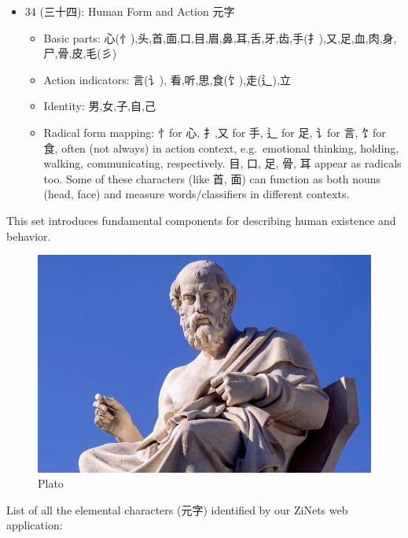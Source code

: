 \documentclass[
  11pt,
  letterpaper,
]{article}
\providecommand{\tightlist}{%
  \setlength{\itemsep}{0pt}\setlength{\parskip}{0pt}}
\begin{document}
\begin{itemize}
\tightlist
\item
  34 (三十四): Human Form and Action 元字

  \begin{itemize}
  \tightlist
  \item
    Basic parts:
    心(忄),头,首,面,口,目,眉,鼻,耳,舌,牙,齿,手(扌),又,足,血,肉,身,尸,骨,皮,毛(彡)
  \item
    Action indicators: 言(讠), 看,听,思,食(饣),走(辶),立
  \item
    Identity: 男,女,子,自,己
  \item
    Radical form mapping: 忄for 心, 扌,又 for 手, 辶 for 足, 讠for 言,
    饣for 食, often (not always) in action context, e.g.~emotional
    thinking, holding, walking, communicating, respectively. 目, 口, 足,
    骨, 耳 appear as radicals too. Some of these characters (like 首,
    面) can function as both nouns (head, face) and measure
    words/classifiers in different contexts.
  \end{itemize}
\end{itemize}

This set introduces fundamental components for describing human
existence and behavior.

\begin{figure}
\centering
\includegraphics{./images/plato.png}
\caption{Plato}
\end{figure}

List of all the elemental characters (元字) identified by our ZiNets web
application:
\end{document}
